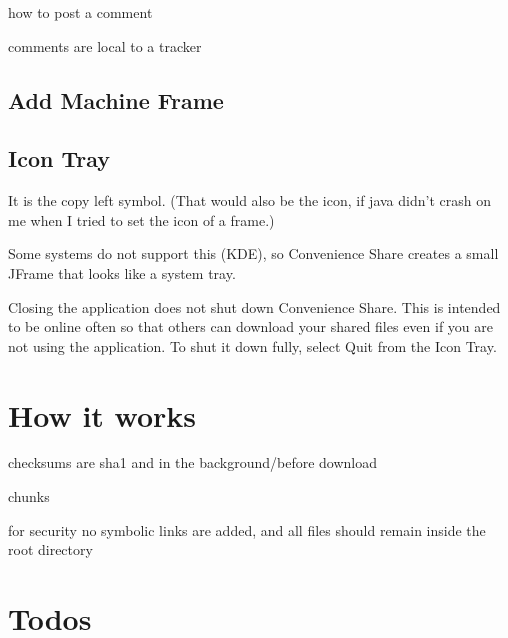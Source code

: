 \documentclass{article}
\begin{document}
how to post a comment

comments are local to a tracker

\subsection{Add Machine Frame}

\subsection{Icon Tray}

It is the copy left symbol.
(That would also be the icon, if java didn't crash on me when I tried to set the icon of a frame.)

Some systems do not support this (KDE), so Convenience Share creates a small JFrame that looks like a system tray.

Closing the application does not shut down Convenience Share.
This is intended to be online often so that others can download your shared files even if you are not using the application.
To shut it down fully, select Quit from the Icon Tray.

\section{How it works}

checksums are sha1 and in the background/before download

chunks

for security no symbolic links are added, and all files should remain inside the root directory


\section {Todos}
\end{document}
